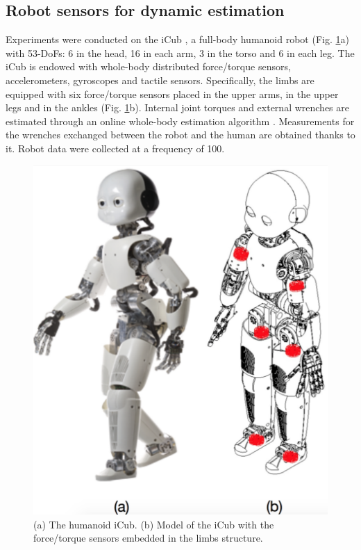 \subsection{Robot sensors for dynamic estimation}
Experiments were conducted on the iCub \cite{Metta2010}, a full-body humanoid
robot (Fig. \ref{fig:iCub_couple}a) with 53-DoFs: 6 in the head, 16 in each arm, 3 in the
 torso and 6 in each leg. The iCub is endowed with whole-body distributed force/torque sensors,
  accelerometers, gyroscopes and tactile sensors. Specifically, the limbs are equipped with six
   force/torque sensors placed in the upper arms, in the upper legs and in the ankles 
   (Fig. \ref{fig:iCub_couple}b). Internal joint torques and external wrenches are estimated
    through an online whole-body estimation algorithm \cite{Nori2015icub}. Measurements for the
    wrenches exchanged between the robot and the human are obtained thanks to it.  Robot data
	 were collected at a frequency of \unit{100}{\hertz}.
%
\begin{figure}
  \centering
    \includegraphics[width=0.55\columnwidth]{figs/iCub_couple}
  \caption{(a) The humanoid iCub. (b) Model of the iCub with the force/torque 
  sensors embedded in the limbs structure.}
  \label{fig:iCub_couple}
\end{figure}

